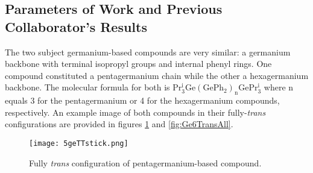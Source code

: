 \subsection{Parameters of Work and Previous Collaborator's Results}

The two subject germanium-based compounds are very similar: a germanium backbone with terminal isopropyl groups and internal phenyl rings. 
One compound constituted a pentagermanium chain while the other a hexagermanium backbone. 
The molecular formula for both is $\mathrm{Pr^{i}_{3}Ge(GePh_{2})_{n}GePr^{i}_{3}}$ where n equals 3 for the pentagermanium or 4 for the hexagermanium compounds, respectively.
An example image of both compounds in their fully-\textit{trans} configurations are provided in figures \ref{fig:Ge5TransAll} and \ref{fig:Ge6TransAll}.

\begin{figure}
	
	\centering
	
	\texttt{[image: 5geTTstick.png]}
	
	\caption{Fully \textit{trans} configuration of pentagermanium-based compound.}
	
	\label{fig:Ge5TransAll}
	
\end{figure}

